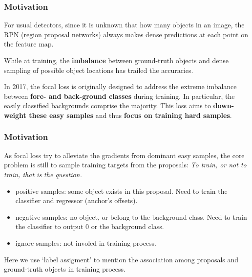 \documentclass[slidetop, mathserif, dvipsnames]{beamer}
\begin{document}
\begin{frame}
    \frametitle{Motivation}

    For usual detectors, since it is unknown that how many objects in an image,
    the RPN (region proposal networks) always makes dense predictions at each
    point on the feature map.

    \quad

    While at training, the {\bf imbalance} between ground-truth objects and dense
    sampling of possible object locations has trailed the accuracies.

    \quad

    In 2017, the focal loss is originally designed to address the extreme imbalance
    between {\bf fore- and back-ground classes} during training.
    In particular, the easily classified backgrounds comprise the majority.
    This loss aims to 
    {\bf down-weight these easy samples} and thus
    {\bf focus on training hard samples}.
\end{frame}

\begin{frame}
    \frametitle{Motivation}

    As focal loss try to alleviate the gradients from dominant easy samples,
    the core problem is still to sample training targets from the proposals:
    {\it To train, or not to train, that is the question.}
    \begin{itemize}
        \item positive samples: some object exists in this proposal.
            Need to train the classifier and regressor (anchor's offsets).
        \item negative samples: no object, or belong to the background class.
            Need to train the classifier to output 0 or the background class.
        \item ignore samples: not involed in training process.
    \end{itemize}

    Here we use `label assigment' to mention the association among
    proposals and ground-truth objects in training process.
\end{frame}
\end{document}
